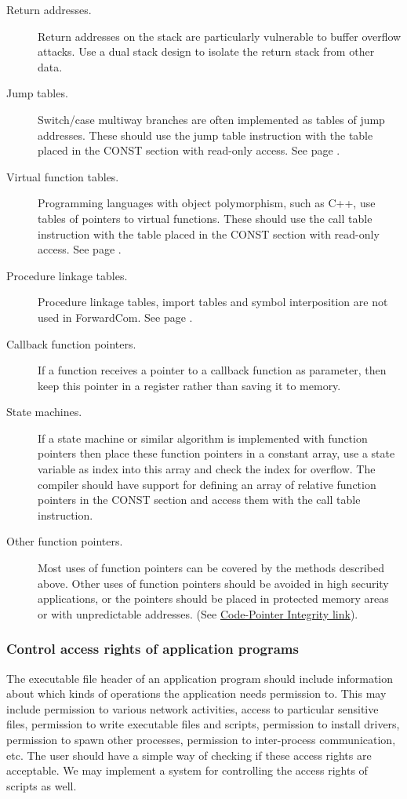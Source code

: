 \documentclass[forwardcom.tex]{subfiles}
\begin{document}
\begin{description}
\item[Return addresses.] Return addresses on the stack are particularly vulnerable to buffer overflow attacks. Use a dual stack design to isolate the return stack from other data.

\item[Jump tables.] Switch/case multiway branches are often implemented as tables of jump addresses. These should use the jump table instruction with the table placed in the CONST section with read-only access. See page \pageref{jumpTableInstruction}.

\item[Virtual function tables.] Programming languages with object polymorphism, such as C++, use tables of pointers to virtual functions. These should use the call table instruction with the table placed in the CONST section with read-only access. See page \pageref{jumpTableInstruction}.

\item[Procedure linkage tables.] Procedure linkage tables, import tables and symbol interposition are not used in ForwardCom. See page \pageref{libraryLinkMethods}.

\item[Callback function pointers.] If a function receives a pointer to a callback function as parameter, then keep this pointer in a register rather than saving it to memory.

\item[State machines.] If a state machine or similar algorithm is implemented with function pointers then place these function pointers in a constant array, use a state variable as index into this array and check the index for overflow. The compiler should have support for defining an array of relative function pointers in the CONST section and access them with the call table instruction.

\item[Other function pointers.] Most uses of function pointers can be covered by the methods described above. Other uses of function pointers should be avoided in high security applications, or the pointers should be placed in protected memory areas or with unpredictable addresses. (See
\href{http://dslab.epfl.ch/proj/cpi/}{Code-Pointer Integrity link}).

\end{description}

\subsubsection{Control access rights of application programs} 
The executable file header of an application program should include information about which kinds of operations the application needs permission to. This may include permission to various network activities, access to particular sensitive files, permission to write executable files and scripts, permission to install drivers, permission to spawn other processes, permission to inter-process communication, etc. The user should have a simple way of checking if these access rights are acceptable. We may implement a system for controlling the access rights of scripts as well.
\end{document}
